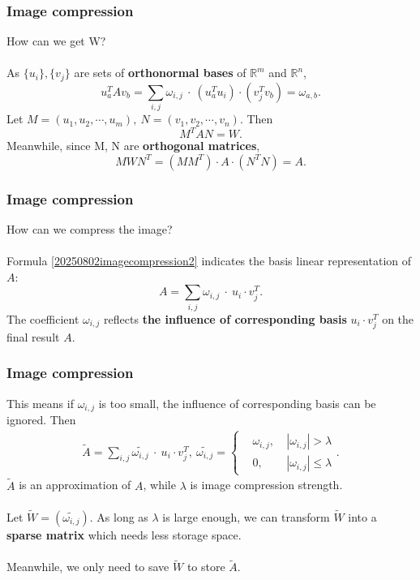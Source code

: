 \documentclass{beamer} %
\begin{document}
\begin{frame}
	\frametitle{Image compression}
	{\color{blue}How can we get W?}\\ \ \\
	As $\{u_{i}\},\{v_{j}\}$ are sets of \textbf{orthonormal bases} of $\mathbb{R}^{m}$ and $\mathbb{R}^{n}$,
	$$u_{a}^{T}Av_{b} = \sum_{i,j}\omega_{i,j}\ \cdot \ (u_{a}^{T}u_{i}) \cdot (v_{j}^{T}v_{b}) = \omega_{a,b}.$$
	Let $M = (u_{1},u_{2},\cdots,u_{m}),\ N = (v_{1},v_{2},\cdots,v_{n}).$ Then
	$$M^{T}AN=W.$$
	Meanwhile, since M, N are \textbf{orthogonal matrices},
	$$MWN^{T}=(MM^{T})\cdot A\cdot(N^{T}N) = A.$$
\end{frame}
\begin{frame}
	\frametitle{Image compression}
	{\color{red}How can we compress the image?}\\ \ \\
	Formula \eqref{20250802imagecompression2} indicates the basis linear representation of $A$:
	$$A = \sum_{i,j}\omega_{i,j}\ \cdot \ u_{i} \cdot v_{j}^{T}.$$
	The coefficient $\omega_{i,j}$ reflects \textbf{the influence of  corresponding basis} $u_{i} \cdot v_{j}^{T}$ on the final result $A$.
\end{frame}
\begin{frame}
	\frametitle{Image compression}
	{\color{blue}This means if $\omega_{i,j}$ is too small, the influence of  corresponding basis can be ignored.} Then
	\begin{align*}
		\widetilde{A} = \sum_{i,j}\widetilde{\omega_{i,j}}\ \cdot \ u_{i} \cdot v_{j}^{T},\ \widetilde{\omega_{i,j}} = \left\{
		\begin{aligned}
			 & \omega_{i,j}, & \ |\omega_{i,j}| > \lambda    \\
			 & 0,            & \ |\omega_{i,j}| \leq \lambda
		\end{aligned}
		\right..
	\end{align*}
	$\widetilde{A}$ is an approximation of $A$, while $\lambda$ is image compression strength.\\ \ \\
	Let $\widetilde{W} = (\widetilde{\omega_{i,j}}).$ As long as $\lambda$ is large enough, we can transform $\widetilde{W}$ into a \textbf{sparse matrix} which needs less storage space.\\ \ \\
	Meanwhile, we only need to save $\widetilde{W}$ to store $\widetilde{A}$.
\end{frame}
\end{document}
